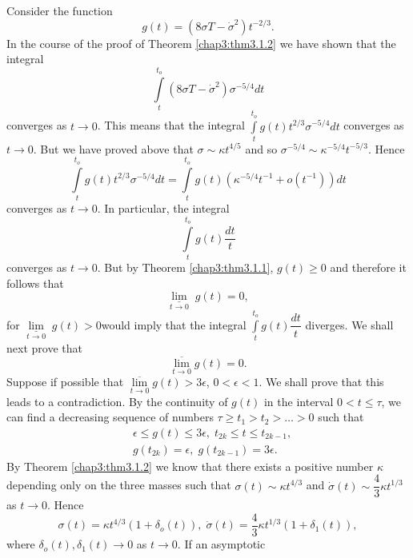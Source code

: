 Consider the function
\begin{equation*}
g(t) = (8\sigma T - \dot{\sigma}^2)
t^{-2/3}. \tag{3.1.22}\label{chap3:eq3.1.22} 
\end{equation*}
In the course of the proof of Theorem \ref{chap3:thm3.1.2} we have
shown that the 
integral
$$
\int\limits^{t_o}_t (8\sigma T - \dot{\sigma}^2) \sigma^{-5/4} dt
$$
converges as $t \to 0$. This means that the integral
$\int\limits^{t_o}_t g (t)t^{2/3} \sigma^{-5/4}dt$ converges as $t \to
0$. But  we have proved above that $\sigma \sim\kappa t^{4/5}$ and so
$\sigma^{-5/4} \sim \kappa^{-5/4} t^{-5/3}$. Hence
$$
\int\limits^{t_o}_t g(t) t^{2/3} \sigma^{-5/4} dt =
\int\limits^{t_o}_t g(t) (\kappa^{-5/4} t^{-1} + o (t^{-1})) dt
$$
converges as $t \to 0$. In particular, the integral
\begin{equation*}
\int\limits^{t_o}_t g(t) \frac{dt}{t}\tag{3.1.23}\label{chap3:eq3.1.23}
\end{equation*}
converges as $t \to 0$. But by Theorem \ref{chap3:thm3.1.1}, $g(t) \geq 0$ and
therefore it follows that
$$
\underset{t\to 0}{\underline{\lim\limits}} \; g(t) = 0,
$$
for $\underset{t\to 0}{\underline{\lim\limits}} \; g(t)
>0$\pageoriginale would imply that the 
integral $\int\limits^{t_o}_t g(t) \dfrac{dt}{t}$ diverges. We shall
next prove that 
$$
\overline{\lim\limits_{t \to 0}} g(t) = 0. 
$$
Suppose if possible that $\overline{\lim\limits_{t \to 0}} g(t) > 3
\epsilon$, $0< \epsilon < 1$. We shall prove that this leads to a
contradiction. By the continuity of $g(t)$ in the interval $0 < t\leq
\tau$, we can find a decreasing sequence of numbers $\tau \geq t_1 >
t_2 > \ldots > 0$ such that 
\begin{align*}
& \epsilon \leq g(t) \leq 3 \epsilon, \; t_{2k} \leq t \leq t_{2k-1},
  \tag{3.1.24} \label{chap3:eq3.1.24}\\ 
&  g(t_{2k}) = \epsilon, \; g(t_{2k -1}) =
  3\epsilon. \tag{3.1.25}\label{chap3:eq3.1.25} 
\end{align*}
By Theorem \ref{chap3:thm3.1.2} we know that there exists a positive
number $\kappa$ 
depending only on the three masses such that $\sigma(t) \sim\kappa
t^{4/3}$ and $\dot{\sigma}(t) \sim \dfrac{4}{3} \kappa t^{1/3}$ as $t
\to 0$. Hence
\begin{equation*}
\sigma(t) = \kappa t^{4/3} (1+\delta_o(t)), \; \dot{\sigma} (t) =
\frac{4}{3} \kappa t^{1/3} (1+ \delta_1(t)),
\tag{3.1.26}\label{chap3:eq3.1.26} 
\end{equation*}
where $\delta_o(t), \delta_1(t) \to 0$ as $t \to 0$. If an asymptotic
